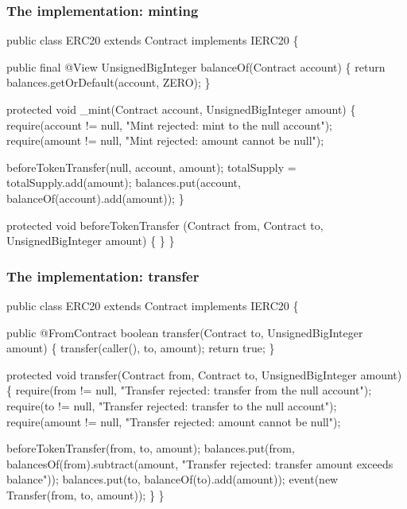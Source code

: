 \documentclass[11pt]{beamer}  %
\def\codesize{\smaller}
\def\<#1>{\codeid{#1}}
\newcommand{\codeid}[1]{\ifmmode{\mbox{\codesize\ttfamily{#1}}}\else{\codesize\ttfamily #1}\fi}
\begin{document}
\begin{frame}[fragile]\frametitle{The \<ERC20> implementation: minting}

{\scriptsize\begin{semiverbatim}
public class ERC20 {\color{red}extends Contract implements IERC20} \{

  public final {\color{red}@View} UnsignedBigInteger balanceOf(Contract account) \{
    return balances.getOrDefault(account, ZERO);
  \}

  protected void _mint(Contract account, UnsignedBigInteger amount) \{
    {\color{armygreen}require(account != null, "Mint rejected: mint to the null account");
    require(amount != null, "Mint rejected: amount cannot be null");}

    beforeTokenTransfer(null, account, amount);
    totalSupply = totalSupply.add(amount);
    balances.put(account, balanceOf(account).add(amount));
  \}

  protected void beforeTokenTransfer
      (Contract from, Contract to, UnsignedBigInteger amount) \{ \}
\}
\end{semiverbatim}}

\end{frame}

\begin{frame}[fragile]\frametitle{The \<ERC20> implementation: transfer}

{\scriptsize\begin{semiverbatim}
public class ERC20 {\color{red}extends Contract implements IERC20} \{

  public {\color{red}@FromContract} boolean transfer(Contract to, UnsignedBigInteger amount) \{
    transfer(caller(), to, amount);
    return true;
  \}

  protected void transfer(Contract from, Contract to, UnsignedBigInteger amount) \{
    {\color{armygreen}require(from != null, "Transfer rejected: transfer from the null account");
    require(to != null, "Transfer rejected: transfer to the null account");
    require(amount != null, "Transfer rejected: amount cannot be null");}

    beforeTokenTransfer(from, to, amount);
    balances.put(from, balancesOf(from).subtract(amount,
      {\color{armygreen}"Transfer rejected: transfer amount exceeds balance"}));
    balances.put(to, balanceOf(to).add(amount));
    {\color{red}event(new Transfer(from, to, amount));}
  \}
\}
\end{semiverbatim}}

\end{frame}
\end{document}
